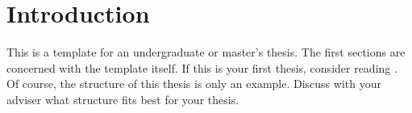 \chapter{Introduction}\label{chap:introduction}
This is a template for an undergraduate or master's thesis. The first sections are concerned with the template itself. If this is your first thesis, consider reading . Of course, the structure of this thesis is only an example. Discuss with your adviser what structure fits best for your thesis.


